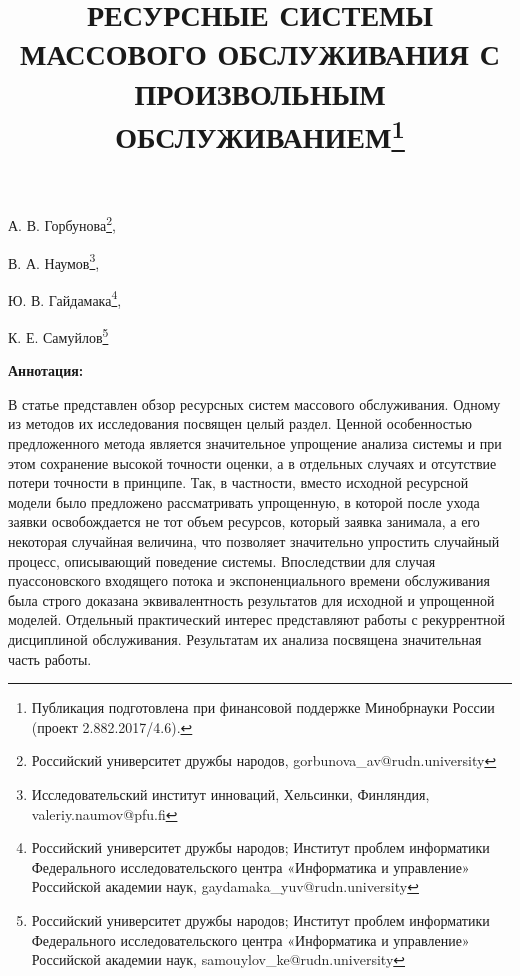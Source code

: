 \documentclass[a4paper,12pt]{article}
\begin{document}
\title{РЕСУРСНЫЕ СИСТЕМЫ МАССОВОГО ОБСЛУЖИВАНИЯ С ПРОИЗВОЛЬНЫМ ОБСЛУЖИВАНИЕМ\thanks{Публикация подготовлена при финансовой поддержке Минобрнауки России (проект 2.882.2017/4.6).}}



\date{}



\maketitle



\vspace{-2cm}



\begin{center}

А. В. Горбунова\footnote[1]{Российский университет дружбы народов, gorbunova\_av@rudn.university},

В. А. Наумов\footnote[2]{Исследовательский институт инноваций, Хельсинки, Финляндия, valeriy.naumov@pfu.fi},

Ю. В. Гайдамака\footnote[3]{Российский университет дружбы народов; Институт проблем информатики Федерального исследовательского центра «Информатика и управление» Российской академии наук, gaydamaka\_yuv@rudn.university},

К. Е. Самуйлов\footnote[4]{Российский университет дружбы народов; Институт проблем информатики Федерального исследовательского центра «Информатика и управление» Российской академии наук, samouylov\_ke@rudn.university}

\end{center}



\sloppy



\noindent

\textbf{Аннотация:}

В статье представлен обзор ресурсных систем массового обслуживания. Одному из методов их исследования посвящен целый раздел. Ценной особенностью предложенного метода является значительное упрощение анализа системы и при этом сохранение высокой точности оценки, а в отдельных случаях и отсутствие потери точности в принципе. Так, в частности, вместо исходной ресурсной модели было предложено рассматривать упрощенную, в которой после ухода заявки освобождается не тот объем ресурсов, который заявка занимала, а его некоторая случайная величина, что позволяет значительно упростить случайный процесс, описывающий поведение системы. Впоследствии для случая пуассоновского входящего потока и экспоненциального времени обслуживания была строго доказана эквивалентность результатов для исходной и упрощенной моделей. Отдельный практический интерес представляют работы с рекуррентной дисциплиной обслуживания. Результатам их анализа посвящена значительная часть работы.
\end{document}
